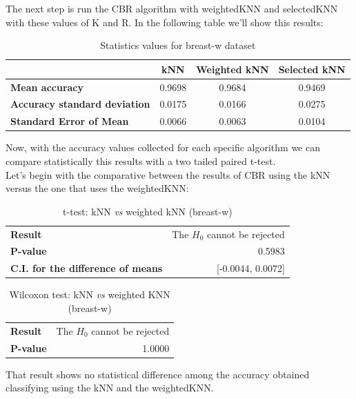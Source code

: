 \documentclass[12pt, a4paper]{article}
\begin{document}
The next step is run the CBR algorithm with weightedKNN and selectedKNN with these values of K and R. In the following table we’ll show this results:\\
\begin{table}[ht!]
	\centering
	\small
	\begin{tabular}{|l|c|c|c|}
		\hline
		\textbf&\textbf{kNN}&\textbf{Weighted kNN}&\textbf{Selected kNN}\\\hline
		\textbf{Mean accuracy}& 0.9698 & 0.9684 & 0.9469\\\hline
		\textbf{Accuracy standard deviation} & 0.0175 & 0.0166 & 0.0275\\\hline
		\textbf{Standard Error of Mean} & 0.0066 & 0.0063 & 0.0104\\\hline
	\end{tabular}
	\caption{Statistics values for breast-w dataset}
	\label{tab:statisticsBreastW}
\end{table}

Now, with the accuracy values collected for each specific algorithm we can compare statistically this results with a two tailed paired t-test.\\

Let’s begin with the comparative between the results of CBR using the kNN versus the one that uses the weightedKNN:\\
\begin{table}[ht!]
	\centering
	\small
	\begin{tabular}{|lr|}
		\hline
		\textbf{Result} & The $H_0$ cannot be rejected\\
		\textbf{P-value} & 0.5983\\
		\textbf{C.I. for the difference of means} & [-0.0044, 0.0072]\\
		\hline
	\end{tabular}
	\caption{t-test: kNN \emph{vs} weighted kNN (breast-w)}
\end{table}
\begin{table}[ht!]
	\centering
	\small
	\begin{tabular}{|lr|}
		\hline
		\textbf{Result} & The $H_0$ cannot be rejected\\
		\textbf{P-value} & 1.0000\\
		\hline
	\end{tabular}
	\caption{Wilcoxon test: kNN \emph{vs} weighted KNN (breast-w)}
\end{table}

That result shows no statistical difference among the accuracy obtained classifying using the kNN and the weightedKNN.\\
\end{document}
